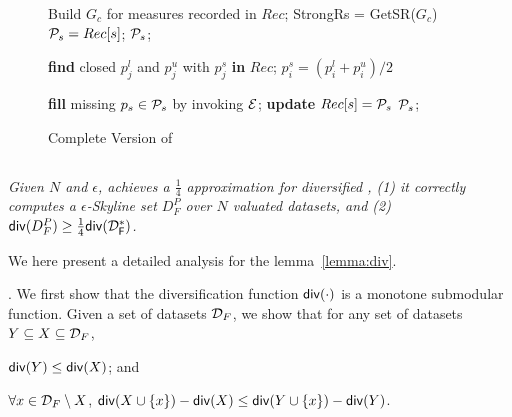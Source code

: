\begin{figure}
\begin{algorithm}[H]
\begin{algorithmic}[1]
\vspace{1ex}
 \label{a2:corrs}
\State Build $G_c$ for measures recorded in $Rec$;
\State StrongRs = GetSR($G_c$)
     
        \State $\P_s=Rec[s]$;
            \Return $\P_s$;
        \EndIf
    \EndIf

      
        \State \textbf{find} closed $p_j^l$ and $p_j^u$ with $p_j^s$ \textbf{in} $Rec$;
        \State $p_i^s = (p_i^l + p_i^u)/2$
        \EndIf
    \EndFor

      
    \State \textbf{fill} missing $p_s \in \P_s$ by invoking $\E$; \textbf{update} $Rec[s] = \P_s$
    \EndIf
\State \Return $\P_s$; 
\EndProcedure \label{a2:corre}
\end{algorithmic}
\end{algorithm}
\vspace{-3ex}
\caption{Complete Version of \bimodis}
\vspace{-3ex}
\label{alg:com-bimodis}
\end{figure}

\subsection{\divmodis}

{\em Given $N$ and $\epsilon$, 
\divmodis achieves a $\frac{1}{4}$ approximation for 
diversified \modis, \ie 
(1) it correctly computes a $\epsilon$-Skyline set $D^P_F$
over $N$ valuated datasets, and 
(2) $\kw{div}(D^P_F)\geq \frac{1}{4}\kw{\kw{div}(\D^*_F)}$.}


We here present a detailed analysis
for the lemma~\ref{lemma:div}.

.  
We first show that 
the diversification function $\kw{div}(\cdot)$
is a monotone submodular function.
Given a set of datasets $\D_F$, 
we show that for any 
set of datasets 
$Y \subseteq X \subseteq \D_F$,

\tbi
\item $\kw{div}(Y) \leq \kw{div}(X)$; and  
\item $\forall x \in \D_F \setminus X$,
$\kw{div}(X \cup \{x\})-\kw{div}(X) \leq \kw{div}(Y \cup \{x\})-\kw{div}(Y)$.
\ei

